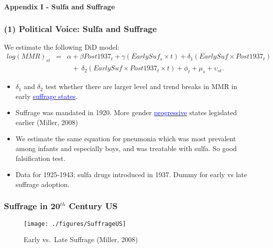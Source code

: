 \documentclass[10pt,letterpaper,subeqn]{beamer}
\begin{document}
\begin{frame}[plain]
\begin{center}
\textbf{Appendix I - Sulfa and Suffrage}
\end{center}
\end{frame}
\begin{frame}
\frametitle{(1) Political Voice: Sulfa and Suffrage}
We estimate the following DiD model:
{\scriptsize
\begin{eqnarray}
log(MMR)_{st} & = &\alpha + \beta Post1937_t + \gamma(EarlySuf_{s}\times t)
                + \delta_1 (EarlySuf\times Post1937_t) \nonumber \\
              & &\ \ \ + \ \delta_2 (EarlySuf\times Post1937_t\times t) + \phi_t + \mu_s
                + \upsilon_{st}. \nonumber
\end{eqnarray}
}
\begin{itemize}
\setlength{\itemsep}{10pt}
  \item $\delta_1$ and $\delta_2$ test whether there are larger level and trend 
        breaks in MMR in early  \hyperlink{SuffrageUS}{\textcolor{blue}{suffrage states}}.
  \item Suffrage was mandated in 1920.  More gender \hyperlink{WhySuffrage}{\textcolor{blue}{progressive}} states legislated
        earlier (Miller, 2008)
  \item We estimate the same equation for pneumonia which was most prevalent 
        among infants and especially boys, and was treatable with sulfa. So good 
        falsification test.
  \item Data for 1925-1943; sulfa drugs introduced in 1937. Dummy for early vs 
        late suffrage adoption.
\end{itemize}
\end{frame}

\begin{frame}[plain,label=SuffrageUS]
\frametitle{Suffrage in 20$^{th}$ Century US}
\begin{figure}[h!]
\centering
\texttt{[image: ./figures/SuffrageUS]}
\caption{Early vs.\ Late Suffrage (Miller, 2008)}
\end{figure}
\end{frame}
\end{document}
